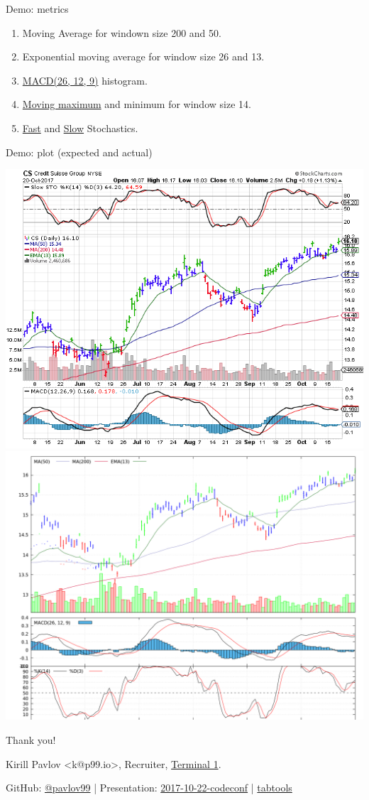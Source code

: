 \documentclass[unicode, notheorems, aspectratio=169]{beamer}
\begin{document}
\begin{frame}{Demo: metrics}
\begin{enumerate}
\item Moving Average for windown size 200 and 50.
\item Exponential moving average for window size 26 and 13.
\item \href{https://en.wikipedia.org/wiki/MACD}{MACD(26, 12, 9)} histogram.
\item \href{https://www.quora.com/How-can-I-solve-this-array-moving-window-max-problem-in-linear-time}{Moving maximum} and minimum for window size 14.
\item \href{https://www.fidelity.com/learning-center/trading-investing/technical-analysis/technical-indicator-guide/fast-stochastic}{Fast} and \href{https://www.fidelity.com/learning-center/trading-investing/technical-analysis/technical-indicator-guide/slow-stochastic}{Slow} Stochastics.
\end{enumerate}
\end{frame}

\begin{frame}{Demo: plot (expected and actual)}
\begin{center}
	\includegraphics[width=.5\textwidth]{./images/credit-suisse-stockcharts}
	\includegraphics[width=.5\textwidth]{./images/metrics}
\end{center}
\end{frame}

\begin{frame}
\begin{center}
{\huge Thank you!}

\vfill
Kirill Pavlov <k@p99.io>, Recruiter, \href{https://t1.gl/k}{Terminal 1}.

{\small
GitHub: \href{https://github.com/pavlov99}{@pavlov99} |
Presentation: \href{https://github.com/pavlov99/presentations/tree/master/2017-10-22-codeconf}{2017-10-22-codeconf} |
\href{https://github.com/pavlov99/tabtools}{tabtools}
}
\end{center}
\end{frame}
\end{document}
